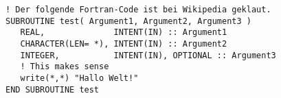 \documentclass{article}
\begin{document}
\begin{lstlisting}
! Der folgende Fortran-Code ist bei Wikipedia geklaut.
SUBROUTINE test( Argument1, Argument2, Argument3 )
   REAL,              INTENT(IN) :: Argument1
   CHARACTER(LEN= *), INTENT(IN) :: Argument2
   INTEGER,           INTENT(IN), OPTIONAL :: Argument3
   ! This makes sense
   write(*,*) "Hallo Welt!"
END SUBROUTINE test
\end{lstlisting}
\end{document}
